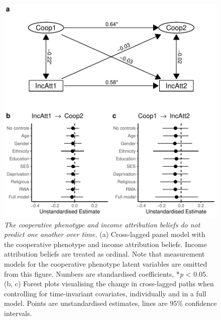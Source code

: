 \documentclass[
  man,floatsintext]{apa6}
\begin{document}
\begin{figure}
\centering
\includegraphics{manuscript_files/figure-latex/clpmPlotIncAtt-1.pdf}
\caption{\label{fig:clpmPlotIncAtt}\emph{The cooperative phenotype and income attribution beliefs do not predict one another over time.} (a) Cross-lagged panel model with the cooperative phenotype and income attribution beliefs. Income attribution beliefs are treated as ordinal. Note that measurement models for the cooperative phenotype latent variables are omitted from this figure. Numbers are standardised coefficients, *\emph{p} \textless{} 0.05. (b, c) Forest plots visualising the change in cross-lagged paths when controlling for time-invariant covariates, individually and in a full model. Points are unstandardised estimates, lines are 95\% confidence intervals.}
\end{figure}

\newpage
\end{document}
